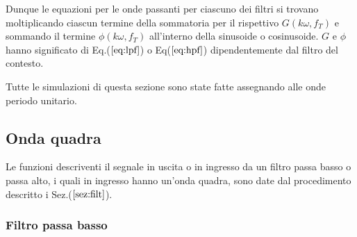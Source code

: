\documentclass{article}
\begin{document}
    Dunque le equazioni per le onde passanti per ciascuno dei filtri si trovano
    moltiplicando ciascun termine della sommatoria per il rispettivo 
    $G \left( k\omega,f_T\right)$ e sommando il termine $\phi \left( k\omega,f_T\right)$ 
    all'interno della sinusoide o cosinusoide. $G$ e $\phi$ hanno significato di Eq.($\ref{eq:lpf}$)
    o Eq($\ref{eq:hpf}$) dipendentemente dal filtro del contesto.

    Tutte le simulazioni di questa sezione sono state fatte assegnando alle onde periodo unitario.
      
    
    \subsection{Onda quadra}
    Le funzioni descriventi il segnale in uscita o in ingresso da un filtro passa basso
    o passa alto, i quali in ingresso hanno un'onda quadra, 
    sono date dal procedimento descritto i Sez.($\ref{sez:filt}$).
        \subsubsection{Filtro passa basso}
            \label{sez:int_quadra}
\end{document}
